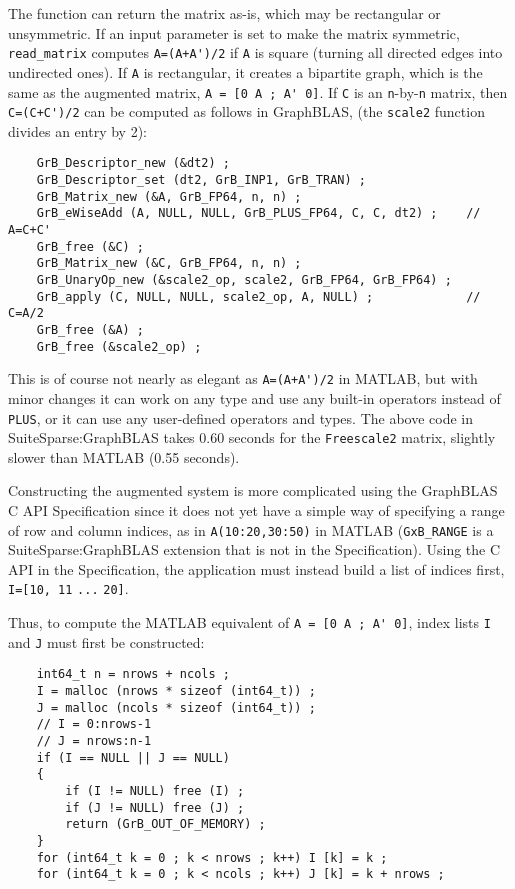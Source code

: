 \documentclass[12pt]{article}
\begin{document}
The function can return the matrix as-is, which may be rectangular or
unsymmetric.  If an input parameter is set to make the matrix symmetric,
\verb'read_matrix' computes \verb"A=(A+A')/2" if \verb'A' is square (turning
all directed edges into undirected ones).  If \verb'A' is rectangular, it
creates a bipartite graph, which is the same as the augmented matrix,
\verb"A = [0 A ; A' 0]".
If \verb'C' is an \verb'n'-by-\verb'n' matrix, then \verb"C=(C+C')/2" can be
computed as follows in GraphBLAS, (the \verb'scale2' function divides an entry
by 2):

    \vspace{-0.05in}
    {\footnotesize
    \begin{verbatim}
    GrB_Descriptor_new (&dt2) ;
    GrB_Descriptor_set (dt2, GrB_INP1, GrB_TRAN) ;
    GrB_Matrix_new (&A, GrB_FP64, n, n) ;
    GrB_eWiseAdd (A, NULL, NULL, GrB_PLUS_FP64, C, C, dt2) ;    // A=C+C'
    GrB_free (&C) ;
    GrB_Matrix_new (&C, GrB_FP64, n, n) ;
    GrB_UnaryOp_new (&scale2_op, scale2, GrB_FP64, GrB_FP64) ;
    GrB_apply (C, NULL, NULL, scale2_op, A, NULL) ;             // C=A/2
    GrB_free (&A) ;
    GrB_free (&scale2_op) ; \end{verbatim}}

This is of course not nearly as elegant as \verb"A=(A+A')/2" in MATLAB, but
with minor changes it can work on any type and use any built-in operators
instead of \verb'PLUS', or it can use any user-defined operators and types.
The above code in SuiteSparse:GraphBLAS takes 0.60 seconds for the
\verb'Freescale2' matrix, slightly slower than MATLAB (0.55 seconds).

Constructing the augmented system is more complicated using the GraphBLAS C API
Specification since it does not yet have a simple way of specifying a range of
row and column indices, as in \verb'A(10:20,30:50)' in MATLAB (\verb'GxB_RANGE'
is a SuiteSparse:GraphBLAS extension that is not in the Specification).  Using
the C API in the Specification, the application must instead build a list of
indices first, \verb'I=[10, 11' \verb'...' \verb'20]'.

Thus, to compute the MATLAB equivalent of \verb"A = [0 A ; A' 0]", index lists
\verb'I' and \verb'J' must first be constructed:

    \vspace{-0.05in}
    {\footnotesize
    \begin{verbatim}
    int64_t n = nrows + ncols ;
    I = malloc (nrows * sizeof (int64_t)) ;
    J = malloc (ncols * sizeof (int64_t)) ;
    // I = 0:nrows-1
    // J = nrows:n-1
    if (I == NULL || J == NULL)
    {
        if (I != NULL) free (I) ;
        if (J != NULL) free (J) ;
        return (GrB_OUT_OF_MEMORY) ;
    }
    for (int64_t k = 0 ; k < nrows ; k++) I [k] = k ;
    for (int64_t k = 0 ; k < ncols ; k++) J [k] = k + nrows ; \end{verbatim}}
\end{document}
